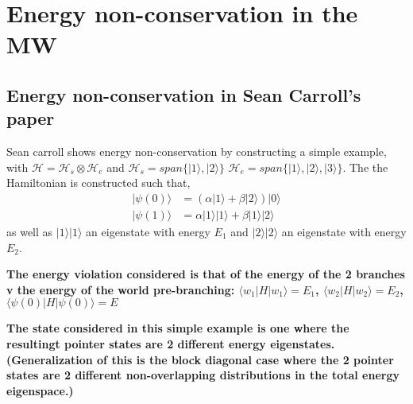\documentclass{article}
\begin{document}
\section{Energy non-conservation in the MW}

\subsection{Energy non-conservation in Sean Carroll's paper}
Sean carroll shows energy non-conservation by constructing a simple example, with $\mathcal{H}=\mathcal{H}_s\otimes\mathcal{H}_e$ and $\mathcal{H}_s=span\{|1\rangle,|2\rangle\}$ $\mathcal{H}_e=span\{|1\rangle,|2\rangle,|3\rangle\}$. The the Hamiltonian is constructed such that,
\begin{align}
    |\psi(0)\rangle&=(\alpha|1\rangle+\beta|2\rangle)|0\rangle\\
    |\psi(1)\rangle&=\alpha|1\rangle|1\rangle+\beta|1\rangle|2\rangle
\end{align}
as well as $|1\rangle|1\rangle$ an eigenstate with energy $E_1$ and $|2\rangle|2\rangle$ an eigenstate with energy $E_2$.

\textbf{The energy violation considered is that of the energy of the 2 branches v the energy of the world pre-branching: $\langle w_1|H|w_1\rangle=E_1$, $\langle w_2|H|w_2\rangle=E_2$, $\langle \psi(0)|H|\psi(0)\rangle=E$}

\textbf{The state considered in this simple example is one where the resultingt pointer states are 2 different energy eigenstates. (Generalization of this is the block diagonal case where the 2 pointer states are 2 different non-overlapping distributions in the total energy eigenspace.)}

\begin{comment}
He suggests an experiment, with a particle in a magnetic field ndergoing spin interaction with another particle passing by. this second particle is then measured. the idea is to start p1 in a superposition of spins (and so energies, being in a magnetic field). by interaction with the passing p2 entangle them. measure p2 collapsing p1 and making the system change from 0 (avg) to 2 worlds of +-E the spin energy in B. 

\begin{align}
    |\psi(t_0)\rangle&=(|\downarrow\rangle+|\uparrow\rangle)|e\rangle=|w_0\rangle\\
    &\rightarrow|\downarrow\rangle|e_1'\rangle+|\uparrow\rangle|e_2'\rangle=|w_1\rangle+|w_2\rangle
\end{align}
\end{comment}
\end{document}
